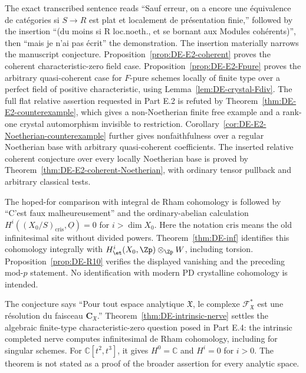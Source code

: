 \begin{remark}\label{rem:DE-quote-E2}
The exact transcribed sentence reads ``Sauf erreur, on a encore une équivalence de catégories si $S\to R$ est plat et localement de présentation finie,'' followed by the insertion ``(du moins si R loc.noeth., et se bornant aux Modules cohérents)'', then ``mais je n'ai pas écrit'' the demonstration.  The insertion materially narrows the manuscript conjecture.  Proposition~\ref{prop:DE-E2-coherent} proves the coherent characteristic-zero field case.  Proposition~\ref{prop:DE-E2-Fpure} proves the arbitrary quasi-coherent case for $F$-pure schemes locally of finite type over a perfect field of positive characteristic, using Lemma~\ref{lem:DE-crystal-Fdiv}.  The full flat relative assertion requested in Part E.2 is refuted by Theorem~\ref{thm:DE-E2-counterexample}, which gives a non-Noetherian finite free example and a rank-one crystal automorphism invisible to restriction.  Corollary~\ref{cor:DE-E2-Noetherian-counterexample} further gives nonfaithfulness over a regular Noetherian base with arbitrary quasi-coherent coefficients.  The inserted relative coherent conjecture over every locally Noetherian base is proved by Theorem~\ref{thm:DE-E2-coherent-Noetherian}, with ordinary tensor pullback and arbitrary classical tests.
\end{remark}

\begin{remark}\label{rem:DE-quote-E3}
The hoped-for comparison with integral de Rham cohomology is followed by ``C'est faux malheureusement'' and the ordinary-abelian calculation
$H^i((X_0/S)_{\mathrm{cris}},\underline O)=0$ for $i>\dim X_0$.  Here the notation $\mathrm{cris}$ means the old infinitesimal site without divided powers.  Theorem~\ref{thm:DE-inf} identifies this cohomology integrally with $H^i_{\et}(X_0,\Zp)\otimes_{\Zp}W$, including torsion.  Proposition~\ref{prop:DE-R10} verifies the displayed vanishing and the preceding mod-$p$ statement.  No identification with modern PD crystalline cohomology is intended.
\end{remark}

\begin{remark}\label{rem:DE-quote-E4}
The conjecture says ``Pour tout espace analytique $\mathfrak X$, le complexe $\mathcal F_{\mathfrak X}^*$ est une résolution du faisceau $\mathbf C_{\mathfrak X}$.''  Theorem~\ref{thm:DE-intrinsic-nerve} settles the algebraic finite-type characteristic-zero question posed in Part E.4: the intrinsic completed nerve computes infinitesimal de Rham cohomology, including for singular schemes.  For $\mathbb C[t^2,t^3]$, it gives $H^0=\mathbb C$ and $H^i=0$ for $i>0$.  The theorem is not stated as a proof of the broader assertion for every analytic space.
\end{remark}

